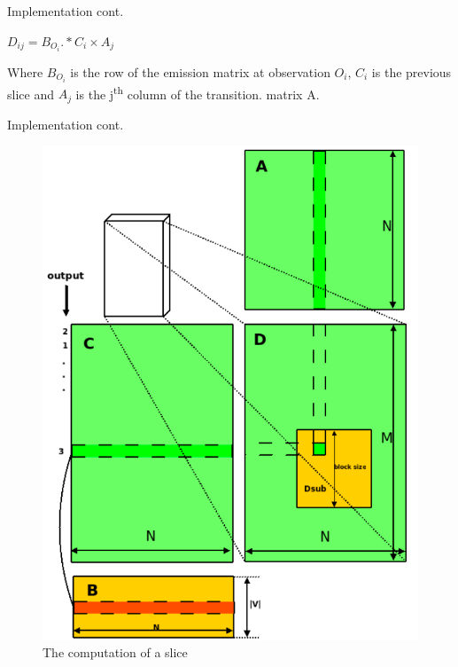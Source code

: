 \documentclass[11pt]{beamer}
\begin{document}
\begin{frame}{Implementation cont.}
\begin{center}

\( D_{ij} = B_{O_i} .* C_i \times A_j \)

\end{center}

Where \( B_{O_i}\) is the row of the emission matrix at observation \(O_i\), \(C_i\) is the previous slice and \(A_j\) is the j\textsuperscript{th} column of the transition. matrix A.
\end{frame}

\begin{frame}{Implementation cont.}
\begin{figure}[H]
\centering

\includegraphics[scale=0.2]{"slice"}
  \caption{The computation of a slice\cite{cuhmm}}
\end{figure}
\end{frame}
\end{document}
